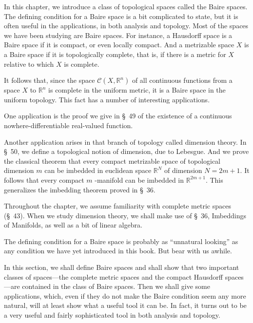 
In this chapter, we introduce a class of topological spaces called the Baire spaces. The defining condition for a Baire space is a bit complicated to state, but it is often useful in the applications, in both analysis and topology. Most of the spaces we have been studying are Baire spaces. For instance, a Hausdorff space is a Baire space if it is compact, or even locally compact. And a metrizable space \(X\) is a Baire space if it is topologically complete, that is, if there is a metric for \(X\) relative to which \(X\) is complete.

It follows that, since the space \(\mathcal{C}({X,\mathbb{R}^{n}})\) of all continuous functions from a space \(X\) to \(\mathbb{R}^{n}\) is complete in the uniform metric, it is a Baire space in the uniform topology. This fact has a number of interesting applications.

One application is the proof we give in \S\ 49 of the existence of a continuous nowhere-differentiable real-valued function.

Another application arises in that branch of topology called dimension theory. In \S\ 50, we define a topological notion of dimension, due to Lebesgue. And we prove the classical theorem that every compact metrizable space of topological dimension \(m\) can be imbedded in euclidean space \(\mathbb{R}^{N}\) of dimension \(N = {2m} + 1\). It follows that every compact \(m\) -manifold can be imbedded in \(\mathbb{R}^{{2m} + 1}\). This generalizes the imbedding theorem proved in \S\ 36.

Throughout the chapter, we assume familiarity with complete metric spaces (\S\ 43). When we study dimension theory, we shall make use of \S\ 36, Imbeddings of Manifolds, as well as a bit of linear algebra.


The defining condition for a Baire space is probably as ``unnatural looking'' as any condition we have yet introduced in this book. But bear with us awhile.

In this section, we shall define Baire spaces and shall show that two important classes of spaces---the complete metric spaces and the compact Hausdorff spaces---are contained in the class of Baire spaces. Then we shall give some applications, which, even if they do not make the Baire condition seem any more natural, will at least show what a useful tool it can be. In fact, it turns out to be a very useful and fairly sophisticated tool in both analysis and topology.

